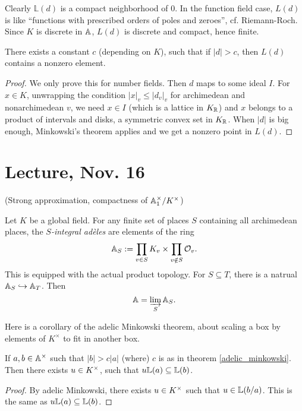 \documentclass[11pt]{amsart}
\begin{document}
Clearly $\mathbb{L}(d)$ is a compact neighborhood of 0. In the function field case, $L(d)$ is like ``functions with prescribed orders of poles and zeroes'', cf. Riemann-Roch. Since $K$ is discrete in $\AA$, $L(d)$ is discrete and compact, hence finite.


\begin{thm}
\label{adelic_minkowski}
There exists a constant $c$ (depending on $K$), such that if $|d| > c$, then $L(d)$ contains a nonzero element.
\end{thm}


\begin{proof}
We only prove this for number fields. Then $d$ maps to some ideal $I$. For $x\in K$, unwrapping the condition $|x|_v \le |d_v|_v$ for archimedean and nonarchimedean $v$, we need $x\in I$ (which is a lattice in $K_{\RR}$) and $x$ belongs to a product of intervals and disks, a symmetric convex set in $K_{\RR}$. When $|d|$ is big enough, Minkowski's theorem applies and we get a nonzero point in $L(d)$.
\end{proof}



\section{Lecture, Nov. 16}

(Strong approximation, compactness of $\AA^{\times}_1/K^{\times}$)



Let $K$ be a global field. For any finite set of places $S$ containing all archimedean places, the \emph{$S$-integral ad\`eles} are elements of the ring
\[\AA_S := \prod_{v\in S} K_v \times \prod_{v\notin S} \cO_v.\]
This is equipped with the actual product topology. For $S\subseteq T$, there is a natrual $\AA_S\into \AA_T$. Then
\[\AA = \varinjlim_{S} \AA_S.\]

Here is a corollary of the adelic Minkowski theorem, about scaling a box by elements of $K^{\times}$ to fit in another box.


\begin{cor}
If $a,b\in \AA^{\times}$ such that $|b| > c|a|$ (where) $c$ is as in theorem \ref{adelic_minkowski}. Then there exists $u\in K\cross$, such that $u\LL(a)\subseteq \LL(b)$.
\end{cor}


\begin{proof}
By adelic Minkowski, there exists $u\in K\cross$ such that $u\in \LL(b/a)$. This is the same as $u\LL(a)\subseteq \LL(b)$.
\end{proof}
\end{document}
